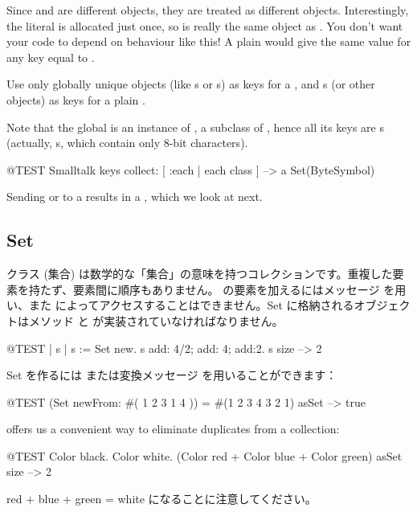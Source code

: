\documentclass[a4paper,10pt,twoside]{book}
\begin{document}
\noindent
Since  and  are different objects, they are treated as different objects.
Interestingly, the literal \mbox{} is allocated just once, so is really the same object as .
You don't want your code to depend on behaviour like this!
A plain  would give the same value for any key equal to .

Use only globally unique objects (like s or s) as keys for a , and s (or other objects) as keys for a plain .


Note that the global  is an instance of , a subclass of , hence all its keys are s (actually, s, which contain only 8-bit characters).

\begin{code}{@TEST}
Smalltalk keys collect: [ :each | each class ] --> a Set(ByteSymbol)
\end{code}
\noindent
Sending  or  to a  results in a , which we look at next.

\subsection{Set}
クラス  (集合) は数学的な「集合」の意味を持つコレクションです。\ie 重複した要素を持たず、要素間に順序もありません。 の要素を加えるにはメッセージ  を用い、また  によってアクセスすることはできません。Set に格納されるオブジェクトはメソッド  と \ct{=} が実装されていなければなりません。

\begin{code}{@TEST | s | }
s := Set new.
s add: 4/2; add: 4; add:2.
s size --> 2
\end{code}

Set を作るには  または変換メッセージ  を用いることができます：

\begin{code}{@TEST}
(Set newFrom: #( 1 2 3 1 4 )) = #(1 2 3 4 3 2 1) asSet --> true
\end{code}

 offers us a convenient way to eliminate duplicates from a collection:
\begin{code}{@TEST}
{ Color black. Color white. (Color red + Color blue + Color green) } asSet size --> 2
\end{code}
\noindent
red + blue + green = white になることに注意してください。
\end{document}
